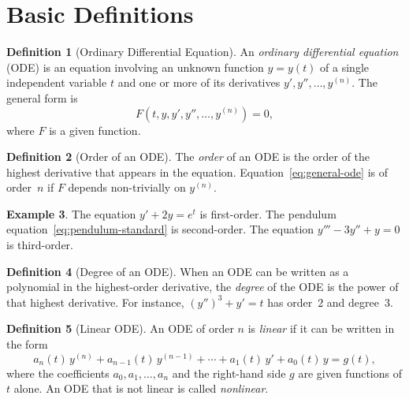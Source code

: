 \documentclass[12pt,a4paper,openany]{book}
\theoremstyle{definition}
\newtheorem{definition}{Definition}[chapter]
\newtheorem{example}[definition]{Example}
\theoremstyle{plain}
\theoremstyle{remark}
\begin{document}
\section{Basic Definitions}
\label{sec:basic-definitions}

\begin{definition}[Ordinary Differential Equation]
\label{def:ode}
An \emph{ordinary differential equation} (ODE) is an equation involving an unknown function $y = y(t)$ of a single independent variable $t$ and one or more of its derivatives $y', y'', \ldots, y^{(n)}$. The general form is
\begin{equation}\label{eq:general-ode}
  F\!\left(t, y, y', y'', \ldots, y^{(n)}\right) = 0,
\end{equation}
where $F$ is a given function.
\end{definition}

\begin{definition}[Order of an ODE]
\label{def:order}
The \emph{order} of an ODE is the order of the highest derivative that appears in the equation. Equation~\eqref{eq:general-ode} is of order~$n$ if $F$ depends non-trivially on $y^{(n)}$.
\end{definition}

\begin{example}
\label{ex:orders}
The equation $y' + 2y = e^t$ is first-order. The pendulum equation~\eqref{eq:pendulum-standard} is second-order. The equation $y''' - 3y'' + y = 0$ is third-order.
\end{example}

\begin{definition}[Degree of an ODE]
\label{def:degree}
When an ODE can be written as a polynomial in the highest-order derivative, the \emph{degree} of the ODE is the power of that highest derivative. For instance, $(y'')^3 + y' = t$ has order~$2$ and degree~$3$.
\end{definition}

\begin{definition}[Linear ODE]
\label{def:linear-ode}
An ODE of order $n$ is \emph{linear} if it can be written in the form
\begin{equation}\label{eq:linear-ode}
  a_n(t)\,y^{(n)} + a_{n-1}(t)\,y^{(n-1)} + \cdots + a_1(t)\,y' + a_0(t)\,y = g(t),
\end{equation}
where the coefficients $a_0, a_1, \ldots, a_n$ and the right-hand side $g$ are given functions of $t$ alone. An ODE that is not linear is called \emph{nonlinear}.
\end{definition}
\end{document}
